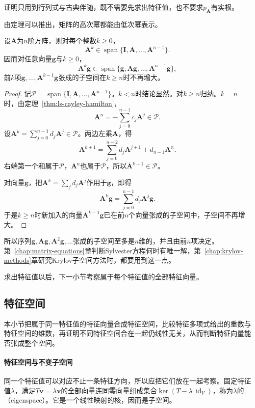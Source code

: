 证明只用到行列式与古典伴随，既不需要先求出特征值，也不要求$p_{\bm A}$有实根。

由定理可以推出，矩阵的高次幂都能由低次幂表示。
\begin{theorem}[高次幂的降次]
\label{thm:ls-power-reduction}
设$\bm A$为$n$阶方阵，则对每个整数$k\geq0$，
\begin{equation}
 \bm A^k\in\operatorname{span}\{\bm I,\bm A,\ldots,\bm A^{n-1}\}.
 \label{eq:ls-power-reduction}
\end{equation}
因而对任意向量$\bm g$与$k\geq0$，
\[
 \bm A^k\bm g\in\operatorname{span}\{\bm g,\bm A\bm g,\ldots,\bm A^{n-1}\bm g\},
\]
前$k$项$\bm g,\ldots,\bm A^{k-1}\bm g$张成的子空间在$k\geq n$时不再增大。
\end{theorem}
\begin{proof}
记$\mathcal P=\operatorname{span}\{\bm I,\bm A,\ldots,\bm A^{n-1}\}$。$k<n$时结论显然。对$k\geq n$归纳。$k=n$时，由定理~\ref{thm:ls-cayley-hamilton}，
\[
 \bm A^n=-\sum_{j=0}^{n-1}c_j\bm A^j\in\mathcal P .
\]
设$\bm A^k=\sum_{j=0}^{n-1}d_j\bm A^j\in\mathcal P$。两边左乘$\bm A$，得
\[
 \bm A^{k+1}=\sum_{j=0}^{n-2}d_j\bm A^{j+1}+d_{n-1}\bm A^n .
\]
右端第一个和属于$\mathcal P$，$\bm A^n$也属于$\mathcal P$，所以$\bm A^{k+1}\in\mathcal P$。

对向量$\bm g$，把$\bm A^k=\sum_jd_j\bm A^j$作用于$\bm g$，即得
\[
 \bm A^k\bm g=\sum_{j=0}^{n-1}d_j\bm A^j\bm g .
\]
于是$k\geq n$时新加入的向量$\bm A^{k-1}\bm g$已在前$n$个向量张成的子空间中，子空间不再增大。
\end{proof}
所以序列$\bm g,\bm A\bm g,\bm A^2\bm g,\ldots$张成的子空间至多是$n$维的，并且由前$n$项决定。第~\ref{chap:matrix-equations}章判断Sylvester方程何时有唯一解，第~\ref{chap:krylov-methods}章研究Krylov子空间方法时，都要用到这一点。

求出特征值以后，下一小节考察属于每个特征值的全部特征向量。

\subsection{特征空间}
\label{sec:ls-eigenspaces}
\label{sec:ls-eigenvector-independence}

本小节把属于同一特征值的特征向量合成特征空间，比较特征多项式给出的重数与特征空间的维数，再证明不同特征空间合在一起仍线性无关，从而判断特征向量能否张成整个空间。

\paragraph{特征空间与不变子空间}
同一个特征值可以对应不止一条特征方向，所以应把它们放在一起考察。固定特征值$\lambda$，满足$T\bm v=\lambda\bm v$的全部向量连同零向量组成集合$\ker(T-\lambda\,\operatorname{id}_V)$，称为$\lambda$的（eigenspace）。它是一个线性映射的核，因而是子空间。

